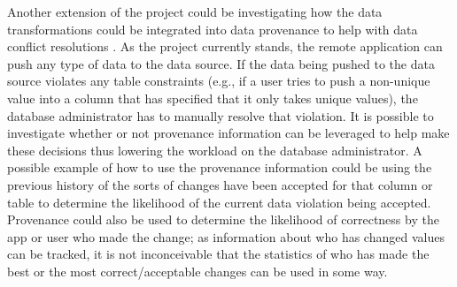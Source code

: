 \documentclass[12pt]{article}
\begin{document}
Another extension of the project could be investigating how the data transformations could be integrated into data provenance to help with data conflict resolutions \cite{arniThesis}. As the project currently stands, the remote application can push any type of data to the data source. If the data being pushed to the data source violates any table constraints (e.g., if a user tries to push a non-unique value into a column that has specified that it only takes unique values), the database administrator has to manually resolve that violation. It is possible to investigate whether or not provenance information can be leveraged to help make these decisions thus lowering the workload on the database administrator. A possible example of how to use the provenance information could be using the previous history of the sorts of changes have been accepted for that column or table to determine the likelihood of the current data violation being accepted. Provenance could also be used to determine the likelihood of correctness by the app or user who made the change; as information about who has changed values can be tracked, it is not inconceivable that the statistics of who has made the best or the most correct/acceptable changes can be used in some way.



\end{document}
